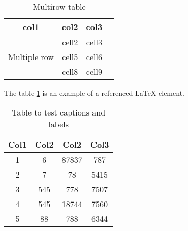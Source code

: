 \documentclass{article}
\begin{document}
\vspace{1cm}

\begin{table}[h!]
\caption{Multirow table}
\begin{center}
\begin{tabular}{ |c|c|c|c| } 
\hline
col1 & col2 & col3 \\
  \hline
  \multirow{3}{4em}{Multiple row} & cell2 & cell3 \\ 
  & cell5 & cell6 \\ 
  & cell8 & cell9 \\ 
  \hline
\end{tabular}
\end{center}
\end{table}

\newpage

The table \ref{table:1} is an example of a referenced \LaTeX{} element.

\begin{table}[h!]
\centering
 \begin{tabular}{||c c c c||} 
 \hline
 Col1 & Col2 & Col2 & Col3 \\ [0.5ex] 
 \hline\hline
 1 & 6 & 87837 & 787 \\ 
 2 & 7 & 78 & 5415 \\
 3 & 545 & 778 & 7507 \\
 4 & 545 & 18744 & 7560 \\
 5 & 88 & 788 & 6344 \\ [1ex] 
 \hline
 \end{tabular}
 \caption{Table to test captions and labels}
 \label{table:1}
\end{table}
\end{document}
